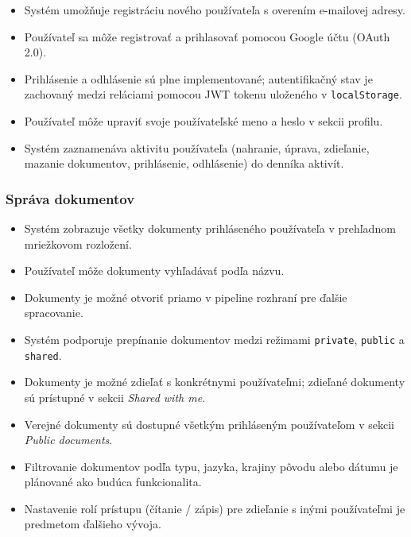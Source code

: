 \begin{itemize}
    \item[\checkmark] Systém umožňuje registráciu nového používateľa s overením e-mailovej adresy.
    \item[\checkmark] Používateľ sa môže registrovať a prihlasovať pomocou Google účtu (OAuth 2.0).
    \item[\checkmark] Prihlásenie a odhlásenie sú plne implementované; autentifikačný stav je zachovaný medzi reláciami pomocou JWT tokenu uloženého v \texttt{localStorage}.
    \item[\checkmark] Používateľ môže upraviť svoje používateľské meno a heslo v sekcii profilu.
    \item[\checkmark] Systém zaznamenáva aktivitu používateľa (nahranie, úprava, zdieľanie, mazanie dokumentov, prihlásenie, odhlásenie) do denníka aktivít.
\end{itemize}

\subsubsection{Správa dokumentov}

\begin{itemize}
    \item[\checkmark] Systém zobrazuje všetky dokumenty prihláseného používateľa v prehľadnom mriežkovom rozložení.
    \item[\checkmark] Používateľ môže dokumenty vyhľadávať podľa názvu.
    \item[\checkmark] Dokumenty je možné otvoriť priamo v pipeline rozhraní pre ďalšie spracovanie.
    \item[\checkmark] Systém podporuje prepínanie dokumentov medzi režimami \texttt{private}, \texttt{public} a \texttt{shared}.
    \item[\checkmark] Dokumenty je možné zdieľať s konkrétnymi používateľmi; zdieľané dokumenty sú prístupné v sekcii \textit{Shared with me}.
    \item[\checkmark] Verejné dokumenty sú dostupné všetkým prihláseným používateľom v sekcii \textit{Public documents}.
    \item[$\circ$] Filtrovanie dokumentov podľa typu, jazyka, krajiny pôvodu alebo dátumu je plánované ako budúca funkcionalita.
    \item[$\circ$] Nastavenie rolí prístupu (čítanie / zápis) pre zdieľanie s inými používateľmi je predmetom ďalšieho vývoja.
\end{itemize}

